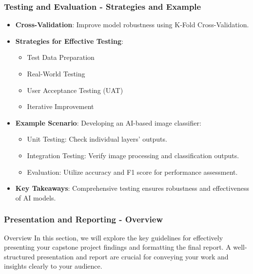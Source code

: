 \documentclass[aspectratio=169]{beamer}
\begin{document}
\begin{frame}[fragile]
    \frametitle{Testing and Evaluation - Strategies and Example}
    \begin{itemize}
        \item \textbf{Cross-Validation}: 
        Improve model robustness using K-Fold Cross-Validation.
        
        \item \textbf{Strategies for Effective Testing}:
        \begin{itemize}
            \item Test Data Preparation
            \item Real-World Testing
            \item User Acceptance Testing (UAT)
            \item Iterative Improvement
        \end{itemize}
        
        \item \textbf{Example Scenario}: Developing an AI-based image classifier:
        \begin{itemize}
            \item Unit Testing: Check individual layers' outputs.
            \item Integration Testing: Verify image processing and classification outputs.
            \item Evaluation: Utilize accuracy and F1 score for performance assessment.
        \end{itemize}
        
        \item \textbf{Key Takeaways}:
        Comprehensive testing ensures robustness and effectiveness of AI models.
    \end{itemize}
\end{frame}

\begin{frame}[fragile]
    \frametitle{Presentation and Reporting - Overview}
    \begin{block}{Overview}
        In this section, we will explore the key guidelines for effectively presenting your capstone project findings and formatting the final report. 
        A well-structured presentation and report are crucial for conveying your work and insights clearly to your audience.
    \end{block}
\end{frame}
\end{document}
